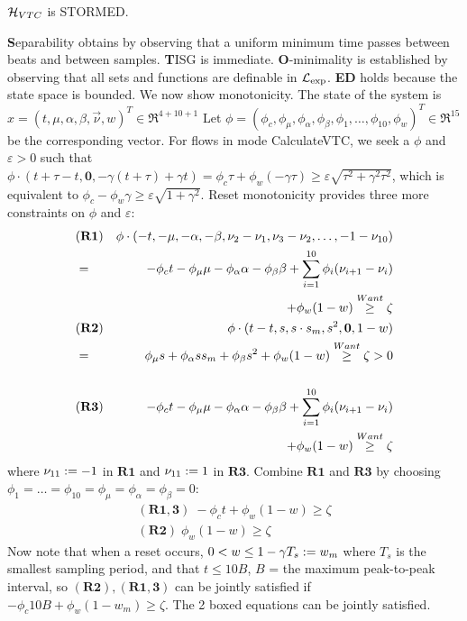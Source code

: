 %
\begin{lemma}
	\label{lemma:vtc}
	$\mathcal{H}_{VTC}$ is STORMED.
	\end{lemma}
\begin{prf}
\textbf{S}eparability obtains by observing that a uniform minimum time passes between beats and between samples. 
\textbf{T}ISG is immediate.
\textbf{O}-minimality is established by observing that all sets and functions are definable in $\mathcal{L}_{\exp}$. \textbf{ED} holds because the state space is bounded.
We now show monotonicity.
The state of the system is $x = (t , \mu ,\alpha, \beta , \vec{\nu}, w)^T \in \Re^{4+10+1}$
Let $\phi = (\phi_c,\phi_\mu,\phi_\alpha,\phi_\beta,\phi_1,\ldots,\phi_{10},\phi_w)^T \in \Re^{15}$ be the corresponding vector.
For flows in mode CalculateVTC, we seek a $\phi$ and $\varepsilon > 0$ such that 
$\phi \cdot (t+\tau -  t , \mathbf{0} , -\gamma(t+\tau) + \gamma t) = \phi_c \tau + \phi_w(-\gamma \tau) \geq \varepsilon \sqrt{\tau^2 + \gamma^2\tau^2}$,
which is equivalent to 
$\boxed{\phi_c - \phi_w\gamma \geq \varepsilon \sqrt{1 + \gamma^2}}$.
Reset monotonicity provides three more constraints on $\phi$ and $\varepsilon$:
\begin{eqnarray*}
&\mathbf{(R1)} &
\phi \cdot (-t, -\mu , -\alpha , -\beta ,\nu_2 - \nu_1 , \nu_3 - \nu_2 , \ldots , -1 - \nu_{10})
\\	
&=& -\phi_c t -\phi_\mu \mu -\phi_\alpha \alpha - \phi_\beta \beta + \sum_{i=1}^{10}\phi_i(\nu_{i+1}-\nu_i) 
\\
&&+ \phi_w(1-w) \stackrel{Want}{\geq} \zeta
%
%
\\
%
%
&\mathbf{(R2)} &
\phi \cdot (t-t , \egm , \egm\cdot \egm_m, \egm^2 , \mathbf{0} , 1-w)
\\
&=& \phi_\mu \egm + \phi_\alpha \egm \egm_m+ \phi_\beta \egm^2 + \phi_w (1-w) \stackrel{Want}{\geq} \zeta > 0
%
%
\\ 
\\ &\mathbf{(R3)} &
 -\phi_c t -\phi_\mu \mu -\phi_\alpha \alpha - \phi_\beta \beta + \sum_{i=1}^{10}\phi_i (\nu_{i+1}-\nu_i) 
 \\
 && + \phi_w(1-w) \stackrel{Want}{\geq} \zeta
\end{eqnarray*}
where $\nu_{11} := -1$ in $\mathbf{R1}$ and $\nu_{11}:= 1$ in $\mathbf{R3}$.
%
Combine $\mathbf{R1}$ and $\mathbf{R3}$ by choosing $\phi_1 = \ldots = \phi_{10}=\phi_\mu = \phi_\alpha = \phi_\beta = 0$:
\begin{eqnarray*}
\label{eq:R23}
\mathbf{(R1,3)}\; -\phi_c t + \phi_w(1-w) \geq \zeta
\\
\mathbf{(R2)}\; \phi_w(1-w) \geq \zeta
\end{eqnarray*}
Now note that when a reset occurs, $0<w \leq 1-\gamma T_s := w_m$ where $T_s$ is the smallest sampling period, and that $t\leq 10B$, $B$ = the maximum peak-to-peak interval, so $\mathbf{(R2)} ,\mathbf{(R1,3)} $ can be jointly satisfied if $\boxed{-\phi_c10B + \phi_w(1-w_m) \geq \zeta}$.
The 2 boxed equations can be jointly satisfied.
	\end{prf}